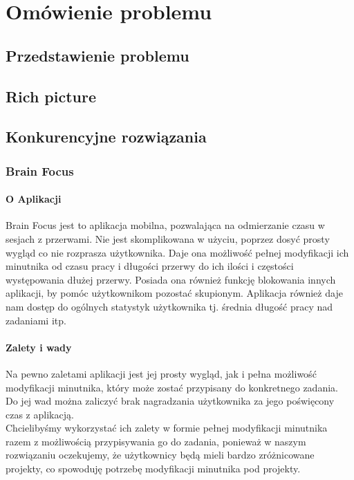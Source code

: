 \documentclass[a4paper,11pt]{report}
\begin{document}
\chapter {Omówienie problemu}
\section {Przedstawienie problemu}

\section {Rich picture}
\section {Konkurencyjne rozwiązania}
\subsection{Brain Focus}
\subsubsection{O Aplikacji}
Brain Focus jest to aplikacja mobilna, pozwalająca na odmierzanie czasu w sesjach z przerwami.
 Nie jest skomplikowana w użyciu, poprzez dosyć prosty wygląd co nie rozprasza użytkownika.
 Daje ona możliwość pełnej modyfikacji ich minutnika od czasu pracy i długości przerwy do ich ilości i częstości występowania dłużej przerwy.
 Posiada ona również funkcję blokowania innych aplikacji, by pomóc użytkownikom pozostać skupionym.
 Aplikacja również daje nam dostęp do ogólnych statystyk użytkownika tj. średnia długość pracy nad zadaniami itp.
\subsubsection{Zalety i wady}
Na pewno zaletami aplikacji jest jej prosty wygląd,
 jak i pełna możliwość modyfikacji minutnika,
 który może zostać przypisany do konkretnego zadania.
\vspace{0,5cm}
 \\Do jej wad można zaliczyć brak nagradzania użytkownika za jego poświęcony czas z aplikacją.
\vspace{0,5cm}
\\Chcielibyśmy wykorzystać ich zalety w formie pełnej modyfikacji minutnika razem z możliwością przypisywania go do zadania,
 ponieważ w naszym rozwiązaniu oczekujemy,
 że użytkownicy będą mieli bardzo zróżnicowane projekty, co spowoduję potrzebę modyfikacji minutnika pod projekty.
\end{document}
